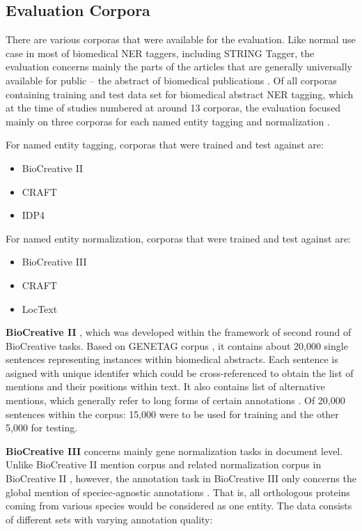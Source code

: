 \subsection{Evaluation Corpora}

There are various corporas that were available for the evaluation. Like normal use case in most of biomedical NER taggers, including STRING Tagger, the evaluation concerns mainly the parts of the articles that are generally universally available for public -- the abstract of biomedical publications \citep{ofner2015evaluation} \citep{nenadic2005mining}. Of all corporas containing training and test data set for biomedical abstract NER tagging, which at the time of studies numbered at around 13 corporas, the evaluation focused mainly on three corporas for each named entity tagging and normalization \citep{ofner2015evaluation}.


For named entity tagging, corporas that were trained and test against are: 

\begin{itemize}
\item BioCreative II
\item CRAFT
\item IDP4
\end{itemize}
 
For named entity normalization, corporas that were trained and test against are:

\begin{itemize}
\item BioCreative III
\item CRAFT
\item LocText
\end{itemize}


\textbf{BioCreative II} \citep{smith2008overview}, which was developed within the framework of second round of BioCreative tasks\citep{hirschman2005overview}. Based on GENETAG corpus \citep{tanabe2005genetag}, it contains about 20,000 single sentences representing instances within biomedical abstracts. Each sentence is asigned with unique identifer which could be cross-referenced to obtain the list of mentions and their positions within text. It also contains list of alternative mentions, which generally refer to long forms of certain annotations \citep{ofner2015evaluation}. Of 20,000 sentences within the corpus: 15,000 were to be used for training and the other 5,000 for testing.

\textbf{BioCreative III} \citep{lu2011gene} concerns mainly gene normalization tasks in document level. Unlike BioCreative II mention corpus and related normalization corpus in BioCreative II \citep{morgan2008overview}, however, the annotation task in BioCreative III only concerns the global mention of speciec-agnostic annotations . That is, all orthologous proteins coming from various species would be considered as one entity. The data consists of different sets with varying annotation quality:

